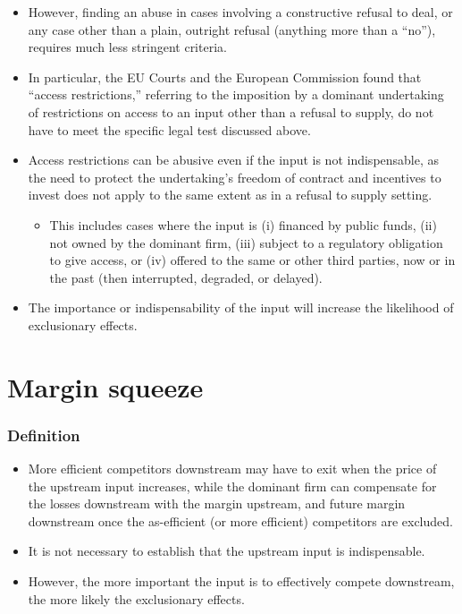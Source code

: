         \begin{itemize}
            \item However, finding an abuse in cases involving a constructive refusal to deal, or any case other than a plain, outright refusal (anything more than a “no”), requires much less stringent criteria.
            \item In particular, the EU Courts and the European Commission found that “access restrictions,” referring to the imposition by a dominant undertaking of restrictions on access to an input other than a refusal to supply, do not have to meet the specific legal test discussed above.
            \item Access restrictions can be abusive even if the input is not indispensable, as the need to protect the undertaking’s freedom of contract and incentives to invest does not apply to the same extent as in a refusal to supply setting.
            \begin{itemize}
                \item This includes cases where the input is (i) financed by public funds, (ii) not owned by the dominant firm, (iii) subject to a regulatory obligation to give access, or (iv) offered to the same or other third parties, now or in the past (then interrupted, degraded, or delayed).
            \end{itemize}
            \item The importance or indispensability of the input will increase the likelihood of exclusionary effects.
        \end{itemize}

\section{Margin squeeze}

        \subsubsection{Definition}


            \begin{itemize}
                \item More efficient competitors downstream may have to exit when the price of the upstream input increases, while the dominant firm can compensate for the losses downstream with the margin upstream, and future margin downstream once the as-efficient (or more efficient) competitors are excluded.
                \item It is not necessary to establish that the upstream input is indispensable.
                \item However, the more important the input is to effectively compete downstream, the more likely the exclusionary effects.
            \end{itemize}

